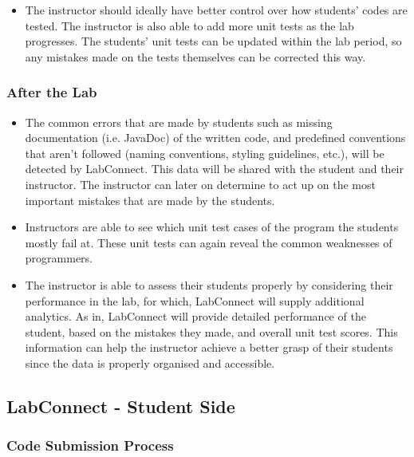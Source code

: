 \documentclass[a4paper, 12pt]{article}
\begin{document}
    \begin{itemize}
        \item The instructor should ideally have better control over how students' codes are tested.
        The instructor is also able to add more unit tests as the lab progresses.
        The students' unit tests can be updated within the lab period, so any mistakes made
        on the tests themselves can be corrected this way.
    \end{itemize}

    \subsubsection{After the Lab}

    \begin{itemize}
        \item The common errors that are made by students such as missing documentation (i.e. JavaDoc)
        of the written code, and predefined conventions that aren't followed (naming conventions, styling
        guidelines, etc.), will be detected by LabConnect. This data will be shared with the student
        and their instructor. The instructor can later on determine to act up on the most
        important mistakes that are made by the students.
        \item Instructors are able to see which unit test cases of the program
        the students mostly fail at. These unit tests can again reveal the common weaknesses
        of programmers.
        \item The instructor is able to assess their students properly by considering their
        performance in the lab, for which, LabConnect will supply additional analytics. 
        As in, LabConnect will provide detailed performance of the student, based on the mistakes they made, and overall unit test scores. 
        This information can help the instructor achieve a better grasp of their students since the data is properly organised
        and accessible.
    \end{itemize}

    \subsection{LabConnect - Student Side}

    \subsubsection{Code Submission Process}
\end{document}
